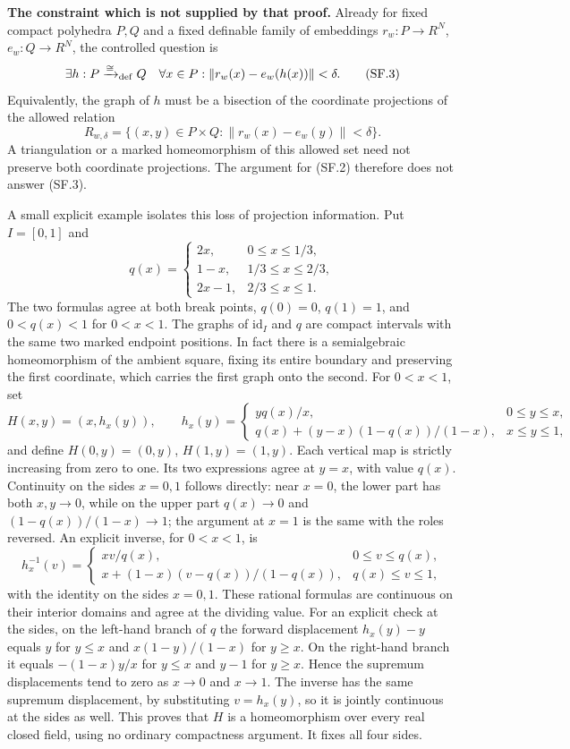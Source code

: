\textbf{The constraint which is not supplied by that proof.}
Already for fixed compact polyhedra $P,Q$ and a fixed definable family
of embeddings $r_w:P\to R^N$, $e_w:Q\to R^N$, the controlled question is
\[
 \exists h:P\xrightarrow{\cong}_{\rm def}Q\quad
 \forall x\in P:
           \|r_w(x)-e_w(h(x))\|<\delta.
 \tag{SF.3}
\]
Equivalently, the graph of $h$ must be a bisection of the coordinate
projections of the allowed relation
\[
 R_{w,\delta}=
   \{(x,y)\in P\times Q:
                    \|r_w(x)-e_w(y)\|<\delta\}.
 \tag{SF.4}
\]
A triangulation or a marked homeomorphism of this allowed set need not
preserve both coordinate projections. The argument for (SF.2) therefore
does not answer (SF.3).

A small explicit example isolates this loss of projection information.
Put $I=[0,1]$ and
\[
 q(x)=
 \begin{cases}
 2x,&0\le x\le1/3,\\
 1-x,&1/3\le x\le2/3,\\
 2x-1,&2/3\le x\le1.
 \end{cases}
 \tag{SF.5}
\]
The two formulas agree at both break points, $q(0)=0$, $q(1)=1$, and
$0<q(x)<1$ for $0<x<1$. The graphs of $\mathrm{id}_I$ and $q$ are
compact intervals with the same two marked endpoint positions. In fact
there is a semialgebraic homeomorphism of the ambient square, fixing its
entire boundary and preserving the first coordinate, which carries the
first graph onto the second. For $0<x<1$, set
\[
 H(x,y)=(x,h_x(y)),\qquad
 h_x(y)=
 \begin{cases}
 yq(x)/x,&0\le y\le x,\\
 q(x)+(y-x)(1-q(x))/(1-x),&x\le y\le1,
 \end{cases}
 \tag{SF.6}
\]
and define $H(0,y)=(0,y)$, $H(1,y)=(1,y)$. Each vertical map is strictly
increasing from zero to one. Its two expressions agree at $y=x$, with
value $q(x)$. Continuity on the sides $x=0,1$ follows directly: near
$x=0$, the lower part has both $x,y\to0$, while on the upper part
$q(x)\to0$ and $(1-q(x))/(1-x)\to1$; the argument at $x=1$ is the
same with the roles reversed. An explicit inverse, for $0<x<1$, is
\[
 h_x^{-1}(v)=
 \begin{cases}
 xv/q(x),&0\le v\le q(x),\\
 x+(1-x)(v-q(x))/(1-q(x)),&q(x)\le v\le1,
 \end{cases}
 \tag{SF.6a}
\]
with the identity on the sides $x=0,1$. These rational formulas are
continuous on their interior domains and agree at the dividing value.
For an explicit check at the sides, on the left-hand branch of $q$ the
forward displacement $h_x(y)-y$ equals $y$ for $y\le x$ and
$x(1-y)/(1-x)$ for $y\ge x$. On the right-hand branch it equals
$-(1-x)y/x$ for $y\le x$ and $y-1$ for $y\ge x$. Hence the supremum
displacements tend to zero as $x\to0$ and $x\to1$. The inverse has the
same supremum displacement, by substituting $v=h_x(y)$, so it is jointly
continuous at the sides as well. This proves that $H$ is a homeomorphism
over every real closed field, using no ordinary compactness argument.
It fixes all four sides.

